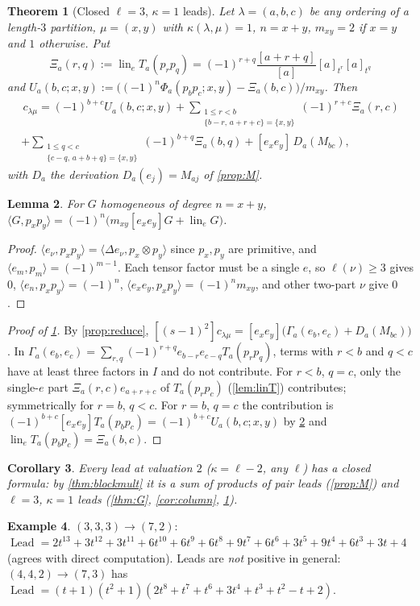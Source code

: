 \documentclass[11pt]{amsart}
\newtheorem{theorem}{Theorem}[section]
\newtheorem{lemma}[theorem]{Lemma}
\newtheorem{corollary}[theorem]{Corollary}
\theoremstyle{definition}
\newtheorem{example}[theorem]{Example}
\theoremstyle{remark}
\numberwithin{equation}{section}
\newcommand{\lin}{\operatorname{lin}_e}
\newcommand{\Lead}{\operatorname{Lead}}
\begin{document}
\begin{theorem}[Closed $\ell=3$, $\kappa=1$ leads]\label{thm:v2}
Let $\lambda=(a,b,c)$ be any ordering of a length-$3$ partition, $\mu=(x,y)$ with $\kappa(\lambda,\mu)=1$, $n=x+y$, $m_{xy}=2$ if $x=y$ and $1$ otherwise. Put \[\Xi_a(r,q):=\lin T_a(p_rp_q)=(-1)^{r+q}\frac{[a+r+q]}{[a]}[a]_{t^r}[a]_{t^q}\] and $U_a(b,c;x,y):=\bigl((-1)^n\Phi_a(p_bp_c;x,y)-\Xi_a(b,c)\bigr)/m_{xy}$. Then
\begin{multline*}
[(s-1)^2]\,c_{\lambda\mu}=(-1)^{b+c}U_a(b,c;x,y)+\sum_{\substack{1\le r<b\\ \{b-r,\,a+r+c\}=\{x,y\}}}(-1)^{r+c}\Xi_a(r,c)\\
+\sum_{\substack{1\le q<c\\ \{c-q,\,a+b+q\}=\{x,y\}}}(-1)^{b+q}\Xi_a(b,q)+[e_xe_y]\,D_a(M_{bc}),
\end{multline*}
with $D_a$ the derivation $D_a(e_j)=M_{aj}$ of \cref{prop:M}.
\end{theorem}
\begin{lemma}\label{lem:pair2}
For $G$ homogeneous of degree $n=x+y$, $\langle G,p_xp_y\rangle=(-1)^n\bigl(m_{xy}[e_xe_y]G+\lin G\bigr)$.
\end{lemma}
\begin{proof}
$\langle e_\nu,p_xp_y\rangle=\langle\Delta e_\nu,p_x\otimes p_y\rangle$ since $p_x,p_y$ are primitive, and $\langle e_m,p_m\rangle=(-1)^{m-1}$. Each tensor factor must be a single $e$, so $\ell(\nu)\ge3$ gives $0$, $\langle e_n,p_xp_y\rangle=(-1)^n$, $\langle e_xe_y,p_xp_y\rangle=(-1)^nm_{xy}$, and other two-part $\nu$ give $0$.
\end{proof}
\begin{proof}[Proof of \cref{thm:v2}]
By \cref{prop:reduce}, $[(s-1)^2]c_{\lambda\mu}=[e_xe_y]\bigl(\Gamma_a(e_b,e_c)+D_a(M_{bc})\bigr)$. In $\Gamma_a(e_b,e_c)=\sum_{r,q}(-1)^{r+q}e_{b-r}e_{c-q}T_a(p_rp_q)$, terms with $r<b$ and $q<c$ have at least three factors in $I$ and do not contribute. For $r<b$, $q=c$, only the single-$e$ part $\Xi_a(r,c)e_{a+r+c}$ of $T_a(p_rp_c)$ (\cref{lem:linT}) contributes; symmetrically for $r=b$, $q<c$. For $r=b$, $q=c$ the contribution is $(-1)^{b+c}[e_xe_y]T_a(p_bp_c)=(-1)^{b+c}U_a(b,c;x,y)$ by \cref{lem:pair2} and $\lin T_a(p_bp_c)=\Xi_a(b,c)$.
\end{proof}
\begin{corollary}\label{cor:v2}
Every lead at valuation $2$ ($\kappa=\ell-2$, any $\ell$) has a closed formula: by \cref{thm:blockmult} it is a sum of products of pair leads (\cref{prop:M}) and $\ell=3$, $\kappa=1$ leads (\cref{thm:G}, \cref{cor:column}, \cref{thm:v2}).
\end{corollary}
\begin{example}\label{ex:v2}
$(3,3,3)\to(7,2)$: $\Lead=2t^{13}+3t^{12}+3t^{11}+6t^{10}+6t^9+6t^8+9t^7+6t^6+3t^5+9t^4+6t^3+3t+4$ (agrees with direct computation). Leads are \emph{not} positive in general: $(4,4,2)\to(7,3)$ has $\Lead=(t+1)(t^2+1)(2t^8+t^7+t^6+3t^4+t^3+t^2-t+2)$.
\end{example}
\end{document}
